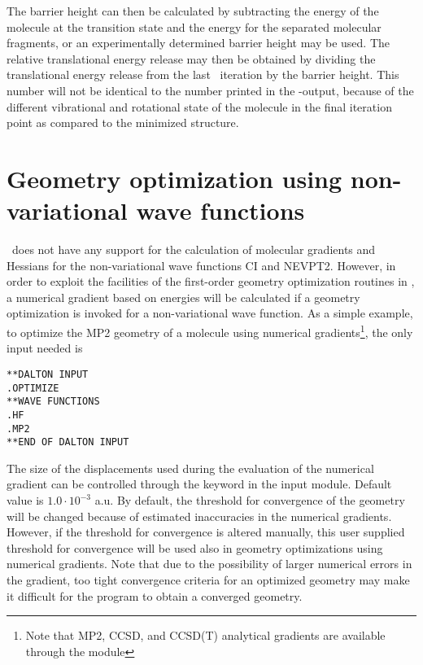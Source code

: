The barrier height can then be calculated by subtracting the energy of
the molecule at the transition state and the energy for the separated
molecular fragments, or an experimentally determined barrier height
may be used. The relative translational energy release may then be
obtained  by dividing the translational energy release
from the last \dalton\ iteration by the barrier height. This number will
not be identical to the number printed in the \dalton -output, because
of the different vibrational and rotational state of
the molecule in the final iteration point as compared to the minimized
structure.

\section{Geometry optimization using non-variational wave
functions}\label{sec:nonvargeom}

\dalton\ does not have any support for the calculation of molecular
gradients and Hessians for the non-variational wave functions 
CI and NEVPT2. However, in order to
exploit the facilities of the first-order
geometry optimization routines in {\dalton}, a numerical
gradient based
on energies will be calculated if a geometry optimization is invoked
for a non-variational wave function. As a simple example, to optimize
the MP2 geometry of a molecule using numerical gradients\footnote{Note
that MP2, CCSD, and CCSD(T) analytical gradients are available through the {\cc}
module}, the only input needed is

\begin{verbatim}
**DALTON INPUT
.OPTIMIZE
**WAVE FUNCTIONS
.HF
.MP2
**END OF DALTON INPUT
\end{verbatim}

The size of the displacements used during the evaluation of the
numerical gradient can be controlled through the keyword
 in the  input module. Default value is
$1.0\cdot 10^{-3}$ a.u. By default, the threshold for convergence
of the geometry will be changed because of estimated inaccuracies
in the numerical gradients. However, if the threshold for
convergence is altered manually, this user supplied threshold for
convergence will be used also in geometry optimizations using
numerical gradients. Note that due to
the possibility of larger numerical errors in the gradient, too
tight convergence criteria for an optimized geometry may make it
difficult for the program to obtain a converged geometry.
